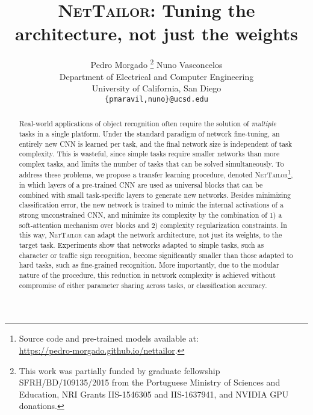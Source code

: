\documentclass[10pt,twocolumn,letterpaper]{article}
\begin{document}
\title{\textsc{NetTailor}: Tuning the architecture, not just the weights}

\author{Pedro Morgado \thanks{This work was partially funded by graduate fellowship SFRH/BD/109135/2015 from the Portuguese Ministry of Sciences and Education, NRI Grants IIS-1546305 and IIS-1637941, and NVIDIA GPU donations.} \qquad Nuno Vasconcelos\\
Department of Electrical and Computer Engineering\\
University of California, San Diego\\
{\tt\small \{pmaravil,nuno\}@ucsd.edu}
}



\maketitle


\begin{abstract}
    Real-world applications of object recognition often require the solution of \textit{multiple} tasks in a single platform.
Under the standard paradigm of network fine-tuning, an entirely new CNN is learned per task, and the final network size is independent of task complexity. 
This is wasteful, since simple tasks require smaller networks than more complex tasks, and limits the number of tasks that can be solved simultaneously.
To address these problems, we propose a transfer learning procedure, denoted \textsc{NetTailor}\footnote{\scriptsize Source code and pre-trained models available at: \\\url{https://pedro-morgado.github.io/nettailor}.}, in which layers of a pre-trained CNN are used as universal blocks that can be combined with small task-specific layers to generate new networks. 
Besides minimizing classification error, the new network is trained to mimic the internal activations of a strong unconstrained CNN, and minimize its complexity by the combination of 1) a soft-attention mechanism over blocks and 2) complexity regularization constraints. 
In this way, \textsc{NetTailor} can adapt the network architecture, not just its weights, to the target task. Experiments show that networks adapted to simple tasks, such as character or traffic sign recognition, become significantly smaller than those adapted to hard tasks, such as fine-grained recognition.
More importantly, due to the modular nature of the procedure, this reduction in network complexity is achieved without compromise of either parameter sharing across tasks, or classification accuracy. \end{abstract}
\end{document}
